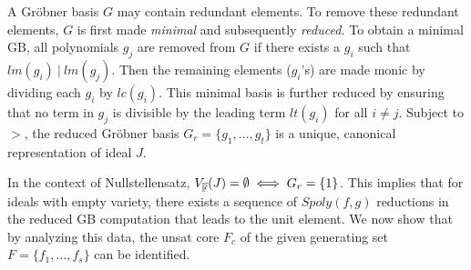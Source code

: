 A Gr\"obner basis $G$ may contain redundant elements. To remove
these redundant elements, $G$ is first made {\it minimal} and
subsequently {\it reduced.} To obtain a minimal GB, all polynomials
$g_j$ are removed from $G$ if there exists a $g_i$ such that 
$lm(g_i) ~|~ lm(g_j)$. Then the remaining elements ($g_i$'s) are made
monic by dividing each $g_i$ by $lc(g_i)$. This minimal basis is
further reduced by ensuring that no term in $g_j$ is divisible by the
leading term $lt(g_i)$ for all $i \neq j$. Subject to %
$>$, the reduced Gr\"obner   basis $G_r = \{g_1, \dots, g_t\}$ is a
unique, canonical representation of ideal $J$. 

In the context of Nullstellensatz, $V_{\overline{\mathbb{F}}}(J) = \emptyset \iff G_r =
\{1\}$. This implies that for ideals with empty variety, there exists
a sequence of $Spoly(f, g)$ reductions in the reduced GB computation
that leads to the unit element. We now show that by analyzing this
data, the unsat core $F_c$ of the given generating set $F =
\{f_1,\dots,f_s\}$ can be identified. 


